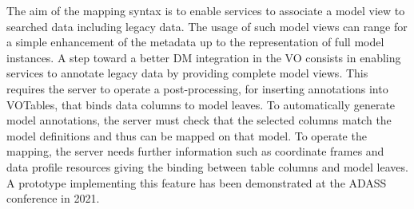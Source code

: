 The aim of the mapping syntax is to enable services to associate a model view to searched data including legacy data.
The usage of such model views can range for a simple enhancement of the metadata up to the representation of full model instances.
A step toward a better DM integration in the VO consists in enabling services to annotate
legacy data by providing complete model
views. This requires the server to operate a post-processing, for inserting annotations into VOTables, 
that binds data columns to model leaves.
To automatically generate model annotations, the server must check that the selected columns 
match the model definitions and thus can be
mapped on that model. To operate the mapping, the server needs further information
such as coordinate frames and data profile resources giving the binding between table
columns and model leaves. A prototype \citep{2201.01732} implementing this feature
has been demonstrated at the ADASS conference in 2021.


